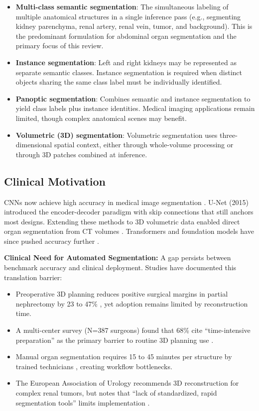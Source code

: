 \begin{itemize}
    \item \textbf{Multi-class semantic segmentation}: The simultaneous labeling of multiple anatomical structures in a single inference pass (e.g., segmenting kidney parenchyma, renal artery, renal vein, tumor, and background). This is the predominant formulation for abdominal organ segmentation and the primary focus of this review.
    
    \item \textbf{Instance segmentation}: Left and right kidneys may be represented as separate semantic classes. Instance segmentation is required when distinct objects sharing the same class label must be individually identified.
    
    \item \textbf{Panoptic segmentation}: Combines semantic and instance segmentation to yield class labels plus instance identities. Medical imaging applications remain limited, though complex anatomical scenes may benefit.
    
    \item \textbf{Volumetric (3D) segmentation}: Volumetric segmentation uses three-dimensional spatial context, either through whole-volume processing or through 3D patches combined at inference.
\end{itemize}

\subsection{Clinical Motivation}

CNNs now achieve high accuracy in medical image segmentation \cite{ronneberger2015unet}. U-Net (2015) introduced the encoder-decoder paradigm with skip connections that still anchors most designs. Extending these methods to 3D volumetric data enabled direct organ segmentation from CT volumes \cite{cicek20163dunet}. Transformers and foundation models have since pushed accuracy further \cite{shamshad2023transformers}.

\textbf{Clinical Need for Automated Segmentation:} A gap persists between benchmark accuracy and clinical deployment. Studies have documented this translation barrier:
\begin{itemize}
    \item Preoperative 3D planning reduces positive surgical margins in partial nephrectomy by 23 to 47\% \cite{porpiglia2018three}, yet adoption remains limited by reconstruction time.
    \item A multi-center survey (N=387 surgeons) found that 68\% cite ``time-intensive preparation'' as the primary barrier to routine 3D planning use \cite{simpfendorfer2016surgeon}.
    \item Manual organ segmentation requires 15 to 45 minutes per structure by trained technicians \cite{sharma2010automated}, creating workflow bottlenecks.
    \item The European Association of Urology recommends 3D reconstruction for complex renal tumors, but notes that ``lack of standardized, rapid segmentation tools'' limits implementation \cite{eau2023guidelines}.
\end{itemize}

